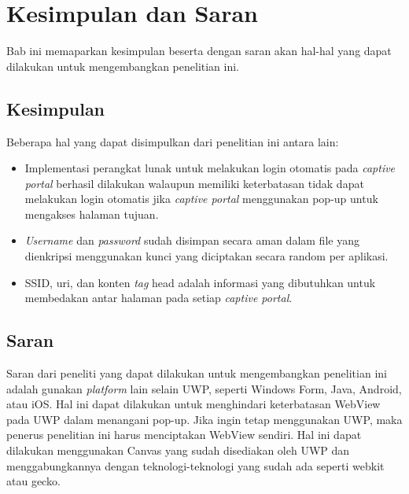 \chapter{Kesimpulan dan Saran}
\label{chap:kesimpulan_dan_saran}

Bab ini memaparkan kesimpulan beserta dengan saran akan hal-hal yang dapat dilakukan untuk mengembangkan penelitian ini.



\section{Kesimpulan}
\label{sec:kesimpulan}

Beberapa hal yang dapat disimpulkan dari penelitian ini antara lain:

\begin{itemize}
    \item{Implementasi perangkat lunak untuk melakukan login otomatis pada \textit{captive portal} berhasil dilakukan walaupun memiliki keterbatasan tidak dapat melakukan login otomatis jika \textit{captive portal} menggunakan pop-up untuk mengakses halaman tujuan.}
    \item{\textit{Username} dan \textit{password} sudah disimpan secara aman dalam file yang dienkripsi menggunakan kunci yang diciptakan secara random per aplikasi.}
    \item{SSID, uri, dan konten \textit{tag} head adalah informasi yang dibutuhkan untuk membedakan antar halaman pada setiap \textit{captive portal}.}
\end{itemize}



\section{Saran}
\label{sec:saran}

Saran dari peneliti yang dapat dilakukan untuk mengembangkan penelitian ini adalah gunakan \textit{platform} lain selain UWP, seperti Windows Form, Java, Android, atau iOS. Hal ini dapat dilakukan untuk menghindari keterbatasan WebView pada UWP dalam menangani pop-up. Jika ingin tetap menggunakan UWP, maka penerus penelitian ini harus menciptakan WebView sendiri. Hal ini dapat dilakukan menggunakan Canvas yang sudah disediakan oleh UWP dan menggabungkannya dengan teknologi-teknologi yang sudah ada seperti webkit atau gecko.